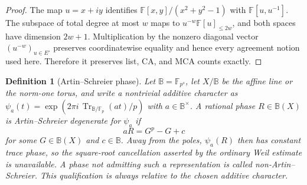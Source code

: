 \documentclass[12pt,a4paper]{amsart}
\numberwithin{equation}{section}
\newtheorem{definition}[definition]{Definition}
\theoremstyle{remark}
\newcommand{\F}{\mathbb F}
\newcommand{\B}{\mathbb B}
\begin{document}
\begin{proof}
The map \(u=x+iy\) identifies \(\F[x,y]/(x^2+y^2-1)\) with \(\F[u,u^{-1}]\).  The subspace of total degree at most \(w\) maps to \(u^{-w}\F[u]_{\le2w}\), and both spaces have dimension \(2w+1\).  Multiplication by the nonzero diagonal vector \((u^{-w})_{u\in E'}\) preserves coordinatewise equality and hence every agreement notion used here.  Therefore it preserves list, CA, and MCA counts exactly.
\end{proof}

\begin{definition}[Artin--Schreier phase]
\label{def:artin-schreier-phase}
Let \(\B=\F_{p^s}\), let \(X/\B\) be the affine line or the norm-one
torus, and write a nontrivial additive character as
\(\psi_a(t)=\exp(2\pi i\,\operatorname{Tr}_{\B/\F_p}(at)/p)\) with
\(a\in\B^\times\).  A rational phase \(R\in\B(X)\) is
\emph{Artin--Schreier degenerate for \(\psi_a\)} if
\[
                 aR=G^p-G+c
\]
for some \(G\in\B(X)\) and \(c\in\B\).  Away from the poles,
\(\psi_a(R)\) then has constant trace phase, so the square-root
cancellation asserted by the ordinary Weil estimate is unavailable.
A phase not admitting such a representation is called
\emph{non-Artin--Schreier}.  This qualification is always relative to
the chosen additive character.
\end{definition}
\end{document}

